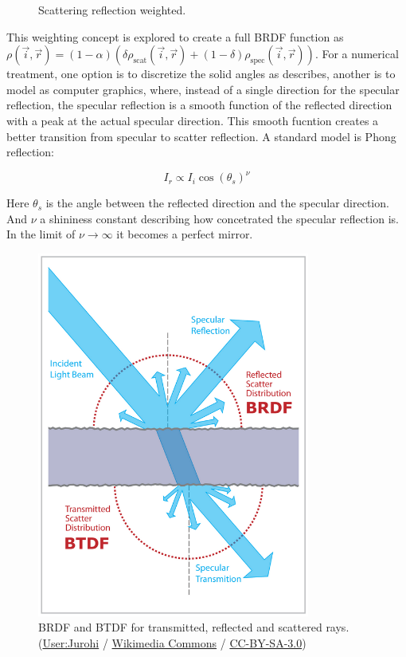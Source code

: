 \begin{figure}[h]
	\centering
	
	\caption{Scattering reflection weighted.}
	\label{fig:scatter}
\end{figure}

This weighting concept is explored to create a full BRDF function as
$\rho(\vec{i},\vec{r}) = (1-\alpha)(\delta \rho_\text{scat}(\vec{i},\vec{r}) +
(1-\delta) \rho_\text{spec}(\vec{i},\vec{r}) )$. For a numerical treatment, one
option is to discretize the solid angles as \citet{siltanen2007room} describes,
another is to model as computer graphics, where, instead of a single direction
for the specular reflection, the specular reflection is a smooth function of the
reflected direction with a peak at the actual specular direction. This smooth
fucntion creates a better transition from specular to scatter reflection. A
standard model is Phong reflection\cite{phong1975illumination}:

\begin{equation}
\label{eq:phong}
I_r \propto	 I_i \cos(\theta_s)^\nu
\end{equation} 

Here $\theta_s$ is the angle between the reflected direction and the specular
direction. And $\nu$ a shininess constant describing how concetrated the
specular reflection is. In the limit of $\nu \to \infty$ it becomes a perfect mirror.


\begin{figure}
	\centering
	\includegraphics[width=0.8\textwidth]{Chap2/fig/BRDF_BTDF}
	\caption{BRDF and BTDF for transmitted, reflected and scattered rays.
	(\textcopyright  \href{http://commons.wikimedia.org/wiki/User:Jurohi}{User:Jurohi} /
	\href{http://commons.wikimedia.org/}{Wikimedia Commons} /
	\href{http://creativecommons.org/licenses/by-sa/3.0/}{CC-BY-SA-3.0})}
	\label{fig:brdfbtdf}
\end{figure}




